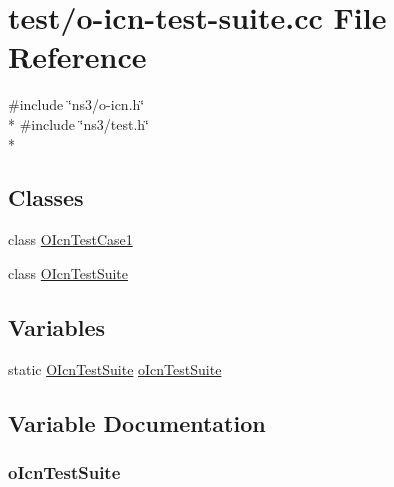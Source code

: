 \hypertarget{o-icn-test-suite_8cc}{\section{test/o-\/icn-\/test-\/suite.cc File Reference}
\label{o-icn-test-suite_8cc}
}
{\ttfamily \#include \char`\"{}ns3/o-\/icn.\-h\char`\"{}}\\*
{\ttfamily \#include \char`\"{}ns3/test.\-h\char`\"{}}\\*
\subsection*{Classes}
\begin{DoxyCompactItemize}
\item 
class \hyperlink{classOIcnTestCase1}{O\-Icn\-Test\-Case1}
\item 
class \hyperlink{classOIcnTestSuite}{O\-Icn\-Test\-Suite}
\end{DoxyCompactItemize}
\subsection*{Variables}
\begin{DoxyCompactItemize}
\item 
static \hyperlink{classOIcnTestSuite}{O\-Icn\-Test\-Suite} \hyperlink{o-icn-test-suite_8cc_abc8b41432974758b69490a73f781273b}{o\-Icn\-Test\-Suite}
\end{DoxyCompactItemize}


\subsection{Variable Documentation}
\hypertarget{o-icn-test-suite_8cc_abc8b41432974758b69490a73f781273b}{
\subsubsection[{o\-Icn\-Test\-Suite}]{ o\-Icn\-Test\-Suite\hspace{0.3cm}{\ttfamily [static]}}}\label{o-icn-test-suite_8cc_abc8b41432974758b69490a73f781273b}
